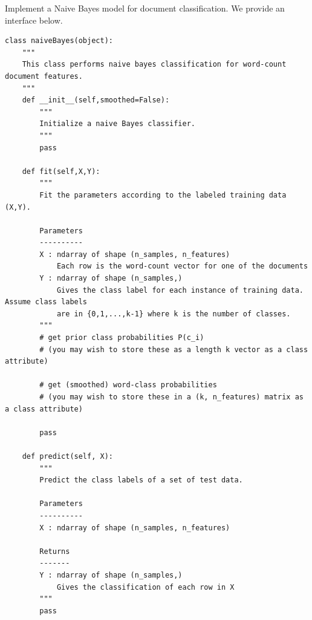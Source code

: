 \begin{problem}
Implement a Naive Bayes model for document classification.
We provide an interface below.

\begin{lstlisting}
class naiveBayes(object):
    """
    This class performs naive bayes classification for word-count document features.
    """
    def __init__(self,smoothed=False):
        """
        Initialize a naive Bayes classifier.
        """
        pass

    def fit(self,X,Y):
        """
        Fit the parameters according to the labeled training data (X,Y).

        Parameters
        ----------
        X : ndarray of shape (n_samples, n_features)
            Each row is the word-count vector for one of the documents
        Y : ndarray of shape (n_samples,)
            Gives the class label for each instance of training data. Assume class labels
            are in {0,1,...,k-1} where k is the number of classes.
        """
        # get prior class probabilities P(c_i)
        # (you may wish to store these as a length k vector as a class attribute)

        # get (smoothed) word-class probabilities
        # (you may wish to store these in a (k, n_features) matrix as a class attribute)

        pass

    def predict(self, X):
        """
        Predict the class labels of a set of test data.

        Parameters
        ----------
        X : ndarray of shape (n_samples, n_features)

        Returns
        -------
        Y : ndarray of shape (n_samples,)
            Gives the classification of each row in X
        """
        pass
\end{lstlisting}
\end{problem}

